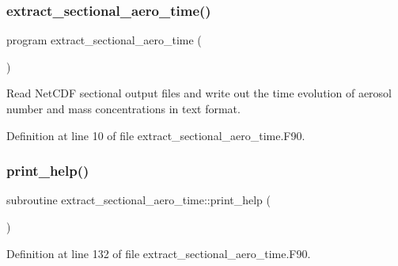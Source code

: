 \subsubsection{\texorpdfstring{extract\+\_\+sectional\+\_\+aero\+\_\+time()}{extract\_sectional\_aero\_time()}}
{\footnotesize\ttfamily program extract\+\_\+sectional\+\_\+aero\+\_\+time (\begin{DoxyParamCaption}{ }\end{DoxyParamCaption})}



Read Net\+C\+DF sectional output files and write out the time evolution of aerosol number and mass concentrations in text format. 



Definition at line 10 of file extract\+\_\+sectional\+\_\+aero\+\_\+time.\+F90.

\mbox{\label{extract__sectional__aero__time_8_f90_ac967c6f80c18fab9e5125dfca31e89fe}} 
\subsubsection{\texorpdfstring{print\+\_\+help()}{print\_help()}}
{\footnotesize\ttfamily subroutine extract\+\_\+sectional\+\_\+aero\+\_\+time\+::print\+\_\+help (\begin{DoxyParamCaption}{ }\end{DoxyParamCaption})}



Definition at line 132 of file extract\+\_\+sectional\+\_\+aero\+\_\+time.\+F90.

